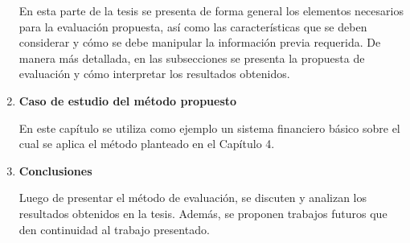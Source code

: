 \begin{enumerate}[label=Capítulo \arabic*,leftmargin=*]
		En esta parte de la tesis se presenta de forma general los elementos necesarios para la evaluación propuesta, así como las características que se deben considerar y cómo se debe manipular la información previa requerida. De manera más detallada, en las subsecciones se presenta la propuesta de evaluación y cómo interpretar los resultados obtenidos.
		\item \textbf{Caso de estudio del método propuesto}
		
		En este capítulo se utiliza como ejemplo un sistema financiero básico sobre el cual se aplica el método planteado en el Capítulo 4.
		\item \textbf{Conclusiones}
		
		Luego de presentar el método de evaluación, se discuten y analizan los resultados obtenidos en la tesis. Además, se proponen trabajos futuros que den continuidad al trabajo presentado.
		
\end{enumerate}
